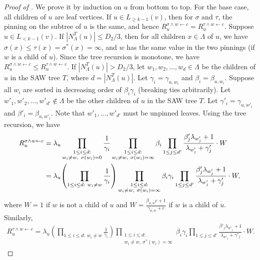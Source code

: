 \documentclass[11pt]{amsart}
\newcommand{\tp}[1]{{\left( #1 \right)}}
\newcommand{\nbd}[2]{N_{#1}^{#2}}
\theoremstyle{definition}
\theoremstyle{remark}
\begin{document}
\begin{proof}[Proof of ]
We prove it by induction on $u$ from bottom to top. For the base case, all children of $u$ are leaf vertices. If $u \in L_{\geq k-1}(v)$, then for $\sigma$ and $\tau$, the pinning on the subtree of $u$ is the same, and hence $R^{\sigma \land w \gets c}_u = R^{\tau \land w \gets c}_u$. Suppose $u \in L_{<k-1}(v)$.
If $|\nbd{\Lambda}{T}(u)| \leq D_2 / 3$, then for all children $x \in \Lambda$ of $u$, we have $\sigma(x) \leq \tau(x) = \sigma^*(x) = \infty$, and $w$ has the same value in the two pinnings (if $w$ is a child of $u$). Since the tree recursion is monotone, we have $R^{\sigma \land w \gets c}_u \leq R^{\tau \land w \gets c}_u$. If $|\nbd{\Lambda}{T}(u)| > D_2 / 3$, let $w_1,w_2,\ldots,w_d \in \Lambda$ be the children of $u$ in the SAW tree $T$, where $d = |N_\Lambda^T(u)|$. Let $\gamma_i = \gamma_{u,w_i}$ and $\beta_i = \beta_{u,w_i}$. Suppose all $w_i$ are sorted in decreasing order of $\beta_i\gamma_i$ (breaking ties arbitrarily). Let $w'_1,w'_2,\ldots,w'_{d'} \notin \Lambda$ be the other children of $u$ in the SAW tree $T$. Let $\gamma'_i = \gamma_{u,w'_i}$ and $\beta'_i = \beta_{u,w'_i}$. Note that $w'_1,\ldots,w'_{d'}$ must be unpinned leaves. Using the tree recursion, we have 
\begin{align}
R^{\sigma \land w \gets c}_u &= \lambda_u \prod_{\substack{1\leq i \leq d:\\ w_i \neq w,\ \sigma(w_i) = 0}} \frac{1}{\gamma_i} \prod_{\substack{1 \leq i \leq d:\\ w_i \neq w,\ \sigma(w_i) = \infty}} \beta_i \prod_{1 \leq j \leq d'} \frac{\beta'_j \lambda_{w'_j} + 1}{\lambda_{w'_j} + \gamma'_j} \cdot W\notag\\
&= \lambda_u \tp{\prod_{1 \leq i \leq d:\ w_i \neq w} \frac{1}{\gamma_i}} \prod_{\substack{1 \leq i \leq d:\\ w_i \neq w,\ \sigma(w_i) = \infty}} \beta_i \gamma_i \prod_{1 \leq j \leq d'} \frac{\beta'_j \lambda_{w'_j} + 1}{\lambda_{w'_j} + \gamma'_j}\cdot W,
\label{eqn:R_u^sigma-wedge-w}
\end{align}
where $W = 1$ if $w$ is not a child of $u$ and $W = \frac{\beta_{u,w} c + 1}{\gamma_{u,w}  + c}$ if $w$ is a child of $u$.
Similarly,
\begin{align}
    R^{\tau \land w \gets c}_u = \lambda_u \tp{\prod_{1 \leq i \leq d:\ w_i \neq w} \frac{1}{\gamma_i}} \prod_{\substack{1 \leq i \leq d:\\ w_i \neq w,\ \sigma^*(w_i) = \infty}} \beta_i \gamma_i \prod_{1 \leq j \leq d'} \frac{\beta'_j \lambda_{w'_j} + 1}{\lambda_{w'_j} + \gamma'_j}\cdot W.
    \label{eqn:R_u^tau-wedge-w}
\end{align}


\end{proof}
\end{document}
